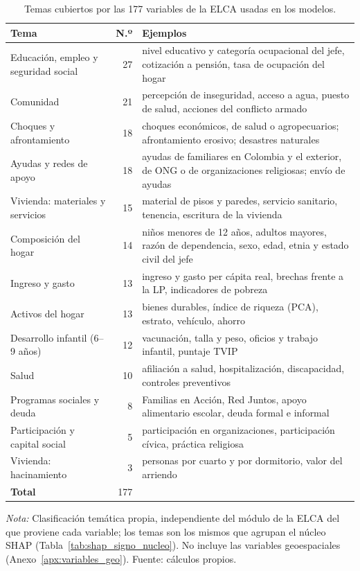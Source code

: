 \begin{table}[H]
  \centering
  \caption{Temas cubiertos por las 177 variables de la ELCA usadas en los modelos.}
  \label{tab:temas_variables}
  \footnotesize
  \begin{tabular}{>{\raggedright\arraybackslash}p{4.2cm}r>{\raggedright\arraybackslash}p{8.6cm}}
    \toprule
    \textbf{Tema} & \textbf{N.º} & \textbf{Ejemplos} \\
    \midrule
    Educación, empleo y seguridad social & 27 & nivel educativo y categoría ocupacional del jefe, cotización a pensión, tasa de ocupación del hogar \\
    Comunidad & 21 & percepción de inseguridad, acceso a agua, puesto de salud, acciones del conflicto armado \\
    Choques y afrontamiento & 18 & choques económicos, de salud o agropecuarios; afrontamiento erosivo; desastres naturales \\
    Ayudas y redes de apoyo & 18 & ayudas de familiares en Colombia y el exterior, de ONG o de organizaciones religiosas; envío de ayudas \\
    Vivienda: materiales y servicios & 15 & material de pisos y paredes, servicio sanitario, tenencia, escritura de la vivienda \\
    Composición del hogar & 14 & niños menores de 12 años, adultos mayores, razón de dependencia, sexo, edad, etnia y estado civil del jefe \\
    Ingreso y gasto & 13 & ingreso y gasto per cápita real, brechas frente a la LP, indicadores de pobreza \\
    Activos del hogar & 13 & bienes durables, índice de riqueza (PCA), estrato, vehículo, ahorro \\
    Desarrollo infantil (6--9 años) & 12 & vacunación, talla y peso, oficios y trabajo infantil, puntaje TVIP \\
    Salud & 10 & afiliación a salud, hospitalización, discapacidad, controles preventivos \\
    Programas sociales y deuda & 8 & Familias en Acción, Red Juntos, apoyo alimentario escolar, deuda formal e informal \\
    Participación y capital social & 5 & participación en organizaciones, participación cívica, práctica religiosa \\
    Vivienda: hacinamiento & 3 & personas por cuarto y por dormitorio, valor del arriendo \\
    \midrule
    \textbf{Total} & 177 & \\
    \bottomrule
  \end{tabular}
  \begin{minipage}{0.95\textwidth}
    \vspace{4pt}
    \footnotesize \textit{Nota:} Clasificación temática propia, independiente del
    módulo de la ELCA del que proviene cada variable; los temas son los mismos que
    agrupan el núcleo SHAP (Tabla~\ref{tab:shap_signo_nucleo}). No incluye las variables geoespaciales
    (Anexo~\ref{apx:variables_geo}). Fuente: cálculos propios.
  \end{minipage}
\end{table}
